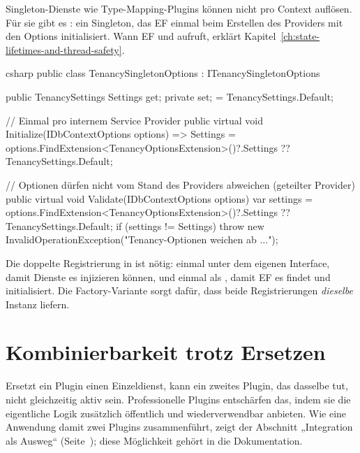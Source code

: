 Singleton-Dienste wie Type-Mapping-Plugins können
 nicht pro Context auflösen. Für sie gibt
es : ein Singleton, das EF einmal beim Erstellen des
Providers mit den Options initialisiert. Wann EF  und 
aufruft, erklärt Kapitel~\ref{ch:state-lifetimes-and-thread-safety}.

\begin{sourcecode}{csharp}
public class TenancySingletonOptions : ITenancySingletonOptions
{
    public TenancySettings Settings { get; private set; } = TenancySettings.Default;

    // Einmal pro internem Service Provider
    public virtual void Initialize(IDbContextOptions options)
        => Settings = options.FindExtension<TenancyOptionsExtension>()?.Settings
                      ?? TenancySettings.Default;

    // Optionen dürfen nicht vom Stand des Providers abweichen (geteilter Provider)
    public virtual void Validate(IDbContextOptions options)
    {
        var settings = options.FindExtension<TenancyOptionsExtension>()?.Settings
                       ?? TenancySettings.Default;
        if (settings != Settings)
            throw new InvalidOperationException("Tenancy-Optionen weichen ab ...");
    }
}
\end{sourcecode}

Die doppelte Registrierung in  ist nötig: einmal unter dem
eigenen Interface, damit Dienste es injizieren können, und einmal als
, damit EF es findet und initialisiert. Die
Factory-Variante sorgt dafür, dass beide Registrierungen \emph{dieselbe} Instanz liefern.

\section{Kombinierbarkeit trotz Ersetzen}

Ersetzt ein Plugin einen Einzeldienst, kann ein zweites Plugin, das dasselbe tut, nicht
gleichzeitig aktiv sein. Professionelle Plugins entschärfen das, indem sie die eigentliche
Logik zusätzlich öffentlich und wiederverwendbar anbieten. Wie eine Anwendung damit zwei
Plugins zusammenführt, zeigt der Abschnitt „Integration als Ausweg“
(Seite~\pageref{sec:integration-way-out}); diese Möglichkeit gehört in die Dokumentation.

